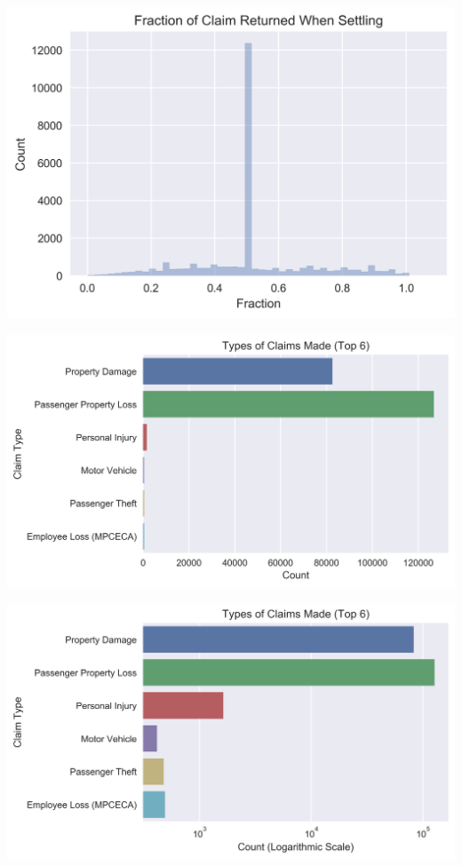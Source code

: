 \documentclass{beamer}
\begin{document}
\begin{frame}
	\includegraphics[keepaspectratio, width = \textwidth, height = \textheight]{../plots/settled}
\end{frame}

\begin{frame}
	\includegraphics[keepaspectratio, width = \textwidth, height = \textheight]{../plots/type}
\end{frame}

\begin{frame}
	\includegraphics[keepaspectratio, width = \textwidth, height = \textheight]{../plots/log_type}
\end{frame}
\end{document}
